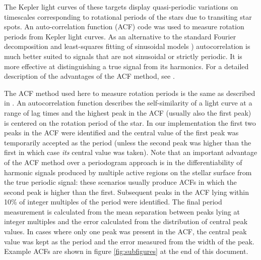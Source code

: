 \documentclass[12pt,preprint]{aastex}
\begin{document}
The Kepler light curves of these targets display quasi-periodic variations on timescales corresponding to rotational periods of the stars due to transiting star spots. An auto-correlation function (ACF) code was used to measure rotation
periods from Kepler light curves. As an alternative to the standard Fourier decomposition
and least-squares fitting of
sinusoidal models \citep{Zechmeister})
 autocorrelation is much better suited to signals that are not
 sinusoidal or strictly periodic. It is more effective at
 distinguishing a true signal from its harmonics.  For a detailed
 description of the advantages of the ACF method, see \citet{McQuillan}.

The ACF method used here to measure rotation periods is the same as described in \citet{McQuillan}. 
An autocorrelation function describes the self-similarity of a light curve at a range of lag times and the highest peak in the ACF (usually also the first peak) is centered on the rotation period of the star. 
In our implementation the first two peaks in the ACF were identified and the central
value of the first peak was temporarily accepted as the period (unless
the second peak was higher than the first in which case {\it its}
central value was taken). 
Note that an important advantage of the ACF method over a periodogram approach is in the differentiability of harmonic signals produced by multiple active regions on the stellar surface from the true periodic signal: these scenarios usually produce ACFs in which the second peak is higher than the first. 
Subsequent peaks in the ACF lying within 10\% of
integer multiples of the period were identified. 
The final period measurement is calculated from the mean separation between peaks lying at integer multiples 
and the error calculated from the distribution of central peak
values. 
In cases where only one peak was present in the ACF, the
central peak value was kept as the period and the error measured from
the width of the peak.  Example ACFs are shown in figure \ref{fig:subfigures} at the end of this document.


\end{document}
